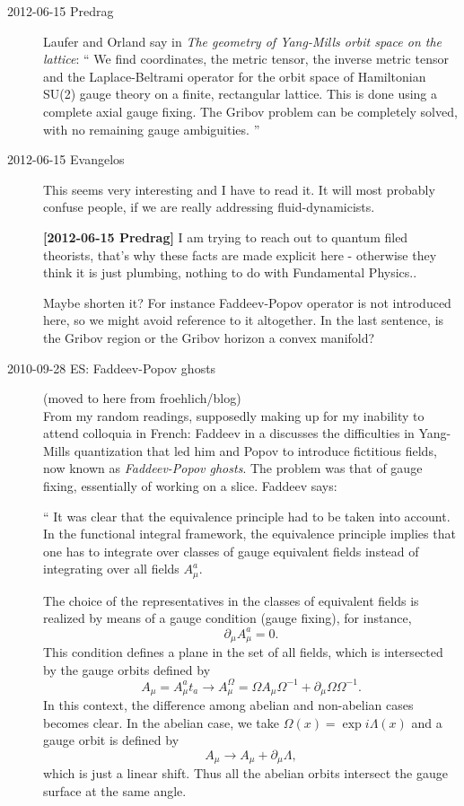 \begin{description}
\item[2012-06-15 Predrag]
Laufer and Orland say in
{\em The geometry of {Yang-Mills} orbit space on the lattice}: ``
We find coordinates, the metric tensor, the inverse metric tensor and the
Laplace-Beltrami operator for the orbit space of Hamiltonian SU(2) gauge
theory on a finite, rectangular lattice. This is done using a complete
axial gauge fixing. The Gribov problem can be completely solved, with no
remaining gauge ambiguities.
''

\item[2012-06-15 Evangelos]
This seems very interesting and I have to read it. It will most probably
confuse people, if we are really addressing fluid-dynamicists.

{\bf [2012-06-15 Predrag]} I am trying to reach out to quantum filed
theorists, that's why these facts are made explicit here - otherwise they
think it is just plumbing, nothing to do with Fundamental Physics..

Maybe shorten it? For instance Faddeev-Popov operator is not introduced
here, so we might avoid reference to it altogether. In the last sentence,
is the Gribov region or the Gribov horizon a convex manifold?

\item[2010-09-28 ES: Faddeev-Popov ghosts]                    \toCB
(moved to here from froehlich/blog)
\\
From my random readings, supposedly making up for my inability to attend
colloquia in French: Faddeev in a
 discusses the difficulties in Yang-Mills quantization that led
him and Popov to introduce fictitious fields, now known as
\emph{Faddeev-Popov ghosts}. The problem was that of gauge fixing,
essentially of working on a slice. Faddeev says:

`` %
It was clear that the equivalence principle had to be taken into account.
In the functional integral framework, the equivalence principle implies
that one has to integrate over classes of gauge equivalent fields instead
of integrating over all fields $A_\mu^a$.

The choice of the representatives in the classes of equivalent fields is
realized by means of a gauge condition (gauge fixing), for instance,
\[
    \partial_{\mu} A_{\mu}^{a} = 0 .
\]
This condition defines a plane in the set of all fields, which is
intersected by the gauge orbits defined by
\[
    A_{\mu} = A_{\mu}^{a}t_{a} \to A_{\mu}^{\Omega}
            = \Omega A_{\mu} \Omega^{-1} + \partial_{\mu} \Omega \Omega^{-1} .
\]
In this context, the difference among abelian and non-abelian cases
becomes clear. In the abelian case, we take $\Omega(x) =
\exp{i\Lambda(x)}$ and a gauge orbit is defined by
\[
    A_{\mu} \to A_{\mu} + \partial_{\mu} \Lambda ,
\]
which is just a linear shift. Thus all the abelian orbits intersect the
gauge surface at the same angle.


\end{description}
